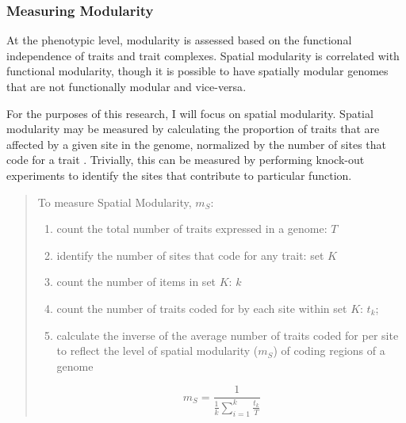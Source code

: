 \documentclass[PhD]{msu-thesis}
\begin{document}

\subsubsection{Measuring Modularity}
At the phenotypic level, modularity is assessed based on the functional independence of traits and trait complexes. Spatial modularity is correlated with functional modularity, though it is possible to have spatially modular genomes that are not functionally modular and vice-versa\cite{pavlicev_model_2012,mezey_is_2000}.  

For the purposes of this research, I will focus on spatial modularity. Spatial modularity may be measured by calculating the proportion of traits that are affected by a given site in the genome, normalized by the number of sites that code for a trait \cite{misevic_sexual_2006}. Trivially, this can be measured by performing knock-out experiments to identify the sites that contribute to particular function.

\begin{quote}
To measure Spatial Modularity, $m_S$:

\begin{enumerate}
\item count the total number of traits expressed in a genome: $T$
\item identify the number of sites that code for any trait: set $K$
\item count the number of items in set $K$: $k$
\item count the number of traits coded for by each site within set $K$: $t_k$;
\item calculate the inverse of the average number of traits coded for per site to reflect the level of spatial modularity ($m_S$) of coding regions of a genome
\end{enumerate}
\begin{equation}
m_S = \frac{1}{\frac{1}{k} {\sum_{i=1}^{k} \frac{t_{k}}{T}}} 
\end{equation}
\end{quote}
\end{document}
